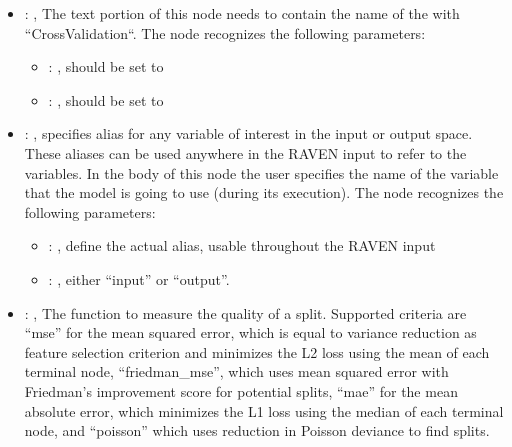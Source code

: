 \begin{itemize}
    \item {}: , 
      The text portion of this node needs to contain the name of the  with
               ``CrossValidation``.
      The  node recognizes the following parameters:
        \begin{itemize}
          \item {}: , 
            should be set to 
          \item {}: , 
            should be set to 
      \end{itemize}

    \item {}: , 
      specifies alias for         any variable of interest in the input or output space. These
      aliases can be used anywhere in the RAVEN input to         refer to the variables. In the body
      of this node the user specifies the name of the variable that the model is going to use
      (during its execution).
      The  node recognizes the following parameters:
        \begin{itemize}
          \item {}: , 
            define the actual alias, usable throughout the RAVEN input
          \item {}: , 
            either ``input'' or ``output''.
      \end{itemize}

    \item {}: , 
      The function to measure the quality of a split. Supported criteria are ``mse'' for the mean
      squared error,                                                  which is equal to variance
      reduction as feature selection criterion and minimizes the L2 loss using the mean of each
      terminal node, ``friedman\_mse'', which uses mean squared error with Friedman's improvement
      score for potential splits,                                                  ``mae'' for the
      mean absolute error, which minimizes the L1 loss using the median of each terminal node, and
      ``poisson''                                                  which uses reduction in Poisson
      deviance to find splits.


\end{itemize}
